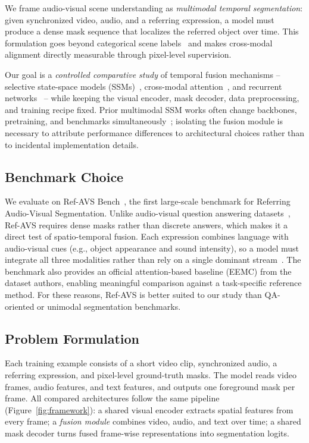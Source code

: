 \documentclass[a4paper,12pt]{extarticle}
\begin{document}
We frame audio-visual scene understanding as \emph{multimodal temporal segmentation}: given synchronized video, audio, and a referring expression, a model must produce a dense mask sequence that localizes the referred object over time. This formulation goes beyond categorical scene labels~\cite{baltrusaitis2019multimodal, wang2024refavs} and makes cross-modal alignment directly measurable through pixel-level supervision.

Our goal is a \emph{controlled comparative study} of temporal fusion mechanisms -- selective state-space models (SSMs)~\cite{dao2024mamba, gu2021s4}, cross-modal attention~\cite{tsai2019multimodal, wang2024refavs}, and recurrent networks~\cite{hochreiter1997long} -- while keeping the visual encoder, mask decoder, data preprocessing, and training recipe fixed. Prior multimodal SSM works often change backbones, pretraining, and benchmarks simultaneously~\cite{zhu2024vlmamba, coupledmamba2024, mixturemamba2025}; isolating the fusion module is necessary to attribute performance differences to architectural choices rather than to incidental implementation details.

\subsection{Benchmark Choice}

We evaluate on Ref-AVS Bench~\cite{wang2024refavs}, the first large-scale benchmark for Referring Audio-Visual Segmentation. Unlike audio-visual question answering datasets~\cite{yang2022avqa, li2022musicavqa}, Ref-AVS requires dense masks rather than discrete answers, which makes it a direct test of spatio-temporal fusion. Each expression combines language with audio-visual cues (e.g., object appearance and sound intensity), so a model must integrate all three modalities rather than rely on a single dominant stream~\cite{wang2024refavs}. The benchmark also provides an official attention-based baseline (EEMC) from the dataset authors, enabling meaningful comparison against a task-specific reference method. For these reasons, Ref-AVS is better suited to our study than QA-oriented or unimodal segmentation benchmarks.

\subsection{Problem Formulation}

Each training example consists of a short video clip, synchronized audio, a referring expression, and pixel-level ground-truth masks. The model reads video frames, audio features, and text features, and outputs one foreground mask per frame. All compared architectures follow the same pipeline (Figure~\ref{fig:framework}): a shared visual encoder extracts spatial features from every frame; a \emph{fusion module} combines video, audio, and text over time; a shared mask decoder turns fused frame-wise representations into segmentation logits.
\end{document}
